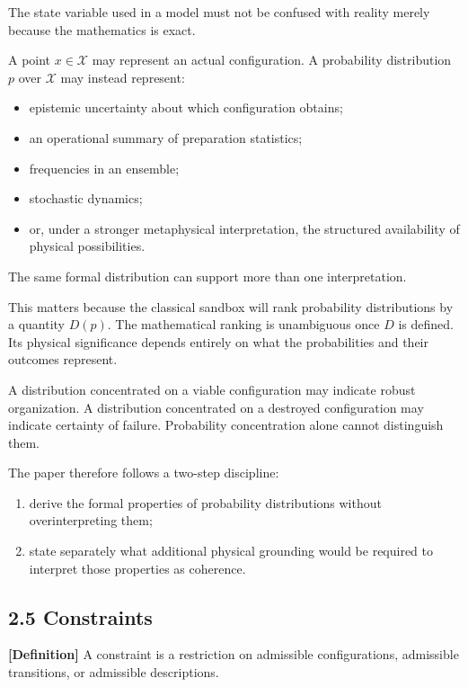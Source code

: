 \documentclass[
  11pt,
]{article}
\providecommand{\tightlist}{%
  \setlength{\itemsep}{0pt}\setlength{\parskip}{0pt}}
\begin{document}
The state variable used in a model must not be confused with reality
merely because the mathematics is exact.

A point \(x\in\mathcal X\) may represent an actual configuration. A
probability distribution \(p\) over \(\mathcal X\) may instead
represent:

\begin{itemize}
\tightlist
\item
  epistemic uncertainty about which configuration obtains;
\item
  an operational summary of preparation statistics;
\item
  frequencies in an ensemble;
\item
  stochastic dynamics;
\item
  or, under a stronger metaphysical interpretation, the structured
  availability of physical possibilities.
\end{itemize}

The same formal distribution can support more than one interpretation.

This matters because the classical sandbox will rank probability
distributions by a quantity \(D(p)\). The mathematical ranking is
unambiguous once \(D\) is defined. Its physical significance depends
entirely on what the probabilities and their outcomes represent.

A distribution concentrated on a viable configuration may indicate
robust organization. A distribution concentrated on a destroyed
configuration may indicate certainty of failure. Probability
concentration alone cannot distinguish them.

The paper therefore follows a two-step discipline:

\begin{enumerate}
\def\labelenumi{\arabic{enumi}.}
\tightlist
\item
  derive the formal properties of probability distributions without
  overinterpreting them;
\item
  state separately what additional physical grounding would be required
  to interpret those properties as coherence.
\end{enumerate}

\subsection{2.5 Constraints}\label{constraints}

\textbf{{[}Definition{]}} A constraint is a restriction on admissible
configurations, admissible transitions, or admissible descriptions.
\end{document}
